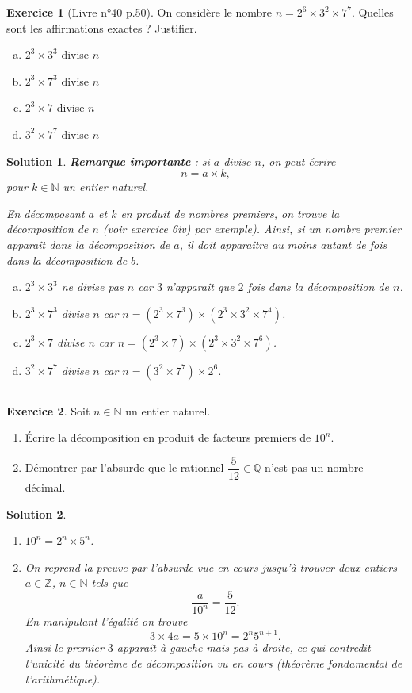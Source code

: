 \documentclass[a4paper, 14pt]{extarticle}
\theoremstyle{plain}
\newtheorem*{sol}{Solution}
\theoremstyle{definition}
\newtheorem{ex}{Exercice}
\newcommand{\Z}{\mathbb{Z}}
\newcommand{\N}{\mathbb{N}}
\newcommand{\Q}{\mathbb{Q}}
\newcommand{\exe}[2]{
		\begin{ex} #1  \end{ex}
		\begin{sol} #2 \end{sol}
	}
\newcommand{\exe}[2]{
		\begin{ex} #1  \end{ex}
	}
\begin{document}
\exe{[Livre n°40 p.50]
	On considère le nombre $n=2^6 \times 3^2 \times 7^7$.
	Quelles sont les affirmations exactes ? Justifier.
	\begin{multicols}{2}
	\begin{enumerate}[a)]
		\item $2^3 \times 3^3$ divise $n$
		\item $2^3 \times 7^3$ divise $n$
		\item $2^3 \times 7$ divise $n$
		\item $3^2 \times 7^7$ divise $n$
	\end{enumerate}
	\end{multicols}
}{

	\textbf{Remarque importante} : si $a$ divise $n$, on peut écrire 
		\[ n = a \times k, \]
	pour $k \in \N$ un entier naturel.
	
	En décomposant $a$ et $k$ en produit de nombres premiers, on trouve la décomposition de $n$ (voir exercice 6iv) par exemple).
	Ainsi, si un nombre premier apparaît dans la décomposition de $a$, il doit apparaître au moins autant de fois dans la décomposition de $b$.
	

	\begin{enumerate}[a)]
		\item $2^3 \times 3^3$ ne divise pas $n$ car $3$ n'apparaît que $2$ fois dans la décomposition de $n$.
		\item $2^3 \times 7^3$ divise $n$ car $n = (2^3 \times 7^3) \times (2^3 \times 3^2 \times 7^4)$.
		\item $2^3 \times 7$ divise $n$ car $n = (2^3 \times 7) \times ( 2^3 \times 3^2 \times 7^6)$.
		\item $3^2 \times 7^7$ divise $n$ car $n=(3^2 \times 7^7) \times 2^6 $.
	\end{enumerate}
}

\hrule

\exe{
	Soit $n \in \N$ un entier naturel.
	\begin{enumerate}
		\item Écrire la décomposition en produit de facteurs premiers de $10^n$.
		\item Démontrer par l'absurde que le rationnel $\dfrac{5}{12} \in \Q$ n'est pas un nombre décimal.
	\end{enumerate}
}
{
	\begin{enumerate}
		\item $10^n = 2^n \times 5^n$.
		\item On reprend la preuve par l'absurde vue en cours jusqu'à trouver deux entiers $a\in\Z$, $n\in\N$ tels que
			\[ \dfrac{a}{10^n} = \dfrac{5}{12}. \]
		En manipulant l'égalité on trouve
			\[ 3 \times 4 a = 5 \times 10^n = 2^n 5^{n+1}. \]
		Ainsi le premier $3$ apparaît à gauche mais pas à droite, ce qui contredit l'unicité du théorème de décomposition vu en cours (théorème fondamental de l'arithmétique).
	\end{enumerate}
}
\end{document}
